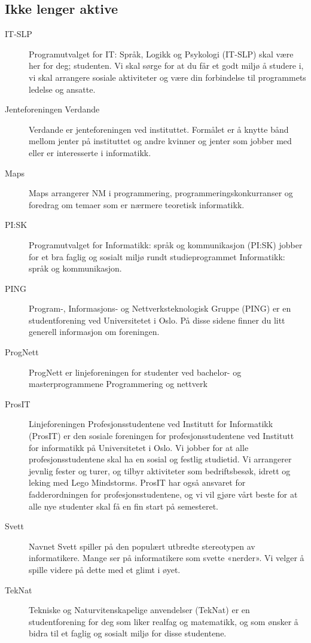 \subsection*{Ikke lenger aktive}

\begin{description}
	\item[IT-SLP] Programutvalget for IT: Språk, Logikk og Psykologi (IT-SLP) skal være her for deg; studenten. Vi skal sørge for at du får et godt miljø å studere i, vi skal arrangere sosiale aktiviteter og være din forbindelse til programmets ledelse og ansatte.
	\item[Jenteforeningen Verdande] Verdande er jenteforeningen ved instituttet. Formålet er å knytte bånd mellom jenter på instituttet og andre kvinner og jenter som jobber med eller er interesserte i informatikk.
	\item[Maps] Maps arrangerer NM i programmering, programmeringskonkurranser og foredrag om temaer som er nærmere teoretisk informatikk.
	\item[PI:SK] Programutvalget for Informatikk: språk og kommunikasjon (PI:SK) jobber for et bra faglig og sosialt miljø rundt studieprogrammet Informatikk: språk og kommunikasjon.
	\item[PING] Program-, Informasjons- og Nettverksteknologisk Gruppe (PING) er en studentforening ved Universitetet i Oslo. På disse sidene finner du litt generell informasjon om foreningen.
	\item[ProgNett] ProgNett er linjeforeningen for studenter ved bachelor- og masterprogrammene Programmering og nettverk
	\item[ProsIT] Linjeforeningen Profesjonsstudentene ved Institutt for Informatikk (ProsIT) er den sosiale foreningen for profesjonsstudentene ved Institutt for informatikk på Universitetet i Oslo. Vi jobber for at alle profesjonsstudentene skal ha en sosial og festlig studietid. Vi arrangerer jevnlig fester og turer, og tilbyr aktiviteter som bedriftsbesøk, idrett og leking med Lego Mindstorms. ProsIT har også ansvaret for fadderordningen for profesjonsstudentene, og vi vil gjøre vårt beste for at alle nye studenter skal få en fin start på semesteret.
	\item[Svett] Navnet Svett spiller på den populært utbredte stereotypen av informatikere. Mange ser på informatikere som svette «nerder». Vi velger å spille videre på dette med et glimt i øyet.
	\item[TekNat] Tekniske og Naturvitenskapelige anvendelser (TekNat) er en studentforening for deg som liker realfag og matematikk, og som ønsker å bidra til et faglig og sosialt miljø for disse studentene.
\end{description}
